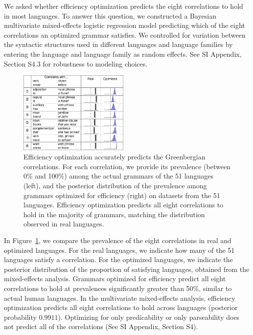 \documentclass[9pt,twocolumn,twoside,lineno]{pnas-new}
\begin{document}
We asked whether efficiency optimization predicts the eight correlations to hold in most languages.
To answer this question, we constructed a Bayesian multivariate mixed-effects logistic regression model predicting which of the eight correlations an optimized grammar satisfies.
We controlled for variation between the syntactic structures used in different languages and language families by entering the language and language family as random effects.
See SI Appendix, Section S4.3 for robustness to modeling choices.


\begin{figure}
    \centering
    \includegraphics[width=0.48\textwidth]{figure6.pdf}

\caption{Efficiency optimization accurately predicts the Greenbergian correlations.
For each correlation, we provide its prevalence (between 0\% and 100\%) among the actual grammars of the 51 languages (left), and the posterior distribution of the prevalence among grammars optimized for efficiency (right) on datasets from the 51 languages.
Efficiency optimization predicts all eight correlations to hold in the majority of grammars, matching the distribution observed in real languages. %
}\label{table:corr-resu}
\end{figure}




In Figure~\ref{table:corr-resu}, we compare the prevalence of the eight correlations in real and optimized languages.
For the real languages, we indicate how many of the 51 languages satisfy a correlation.
For the optimized languages, we indicate the posterior distribution of the proportion of satisfying languages, obtained from the mixed-effects analysis. %
Grammars optimized for efficiency predict all eight correlations to hold at prevalences significantly greater than 50\%, similar to actual human languages.
In the multivariate mixed-effects analysis, efficiency optimization predicts all eight correlations to hold across languages (posterior probability $0.9911$). 
Optimizing for only predicability or only parseability does not predict all of the correlations (See SI Appendix, Section S4).
\end{document}
